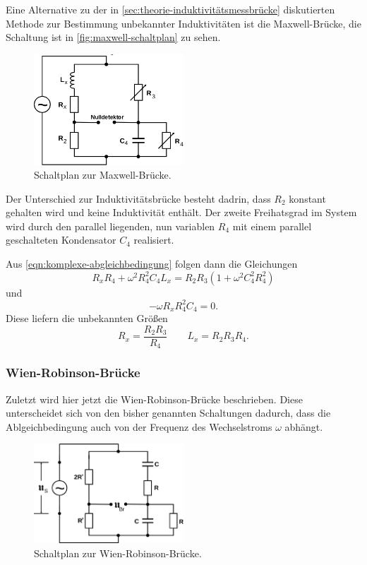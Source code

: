 Eine Alternative zu der in \autoref{sec:theorie-induktivitätsmessbrücke} diskutierten Methode zur
Bestimmung unbekannter Induktivitäten ist die Maxwell-Brücke, die Schaltung ist in 
\autoref{fig:maxwell-schaltplan} zu sehen.
\begin{figure}[H]
	\centering
	\includegraphics[width=0.5\textwidth]{bilder/maxwellbruecke.png}
	\caption{Schaltplan zur Maxwell-Brücke.}
	\label{fig:maxwell-schaltplan}
\end{figure}

Der Unterschied zur Induktivitätsbrücke besteht dadrin, dass $R_2$ konstant gehalten wird und keine 
Induktivität enthält. Der zweite Freihatsgrad im System wird durch den parallel liegenden, nun
variablen $R_4$ mit einem parallel geschalteten Kondensator $C_4$ realisiert.

Aus \autoref{eqn:komplexe-abgleichbedingung} folgen dann die Gleichungen
\begin{equation}
	R_x R_4 + \omega^2 R_4^2 C_4 L_x = R_2 R_3 \left(1 + \omega^2 C_4^2 R_4^2 \right)
	\label{eqn:maxwell-gleichung1}
\end{equation}
und
\begin{equation}
	-\omega R_x R_4^2 C_4 = 0.
	\label{eqn:maxwell-gleichung2}
\end{equation}
Diese liefern die unbekannten Größen
\begin{equation}
	R_x = \frac{R_2 R_3}{R_4}
	\qquad
	L_x = R_2 R_3 R_4.
	\label{eqn:kenngroessen-maxwell}
\end{equation}

\subsubsection{Wien-Robinson-Brücke}
\label{sec:theorie-wien-robinson-bruecke}
Zuletzt wird hier jetzt die Wien-Robinson-Brücke beschrieben. Diese unterscheidet sich von den 
bisher genannten Schaltungen dadurch, dass die Ablgeichbedingung auch von der Frequenz des Wechselstroms $\omega$
abhängt.
\begin{figure}[H]
	\centering
	\includegraphics[width=0.5\textwidth]{bilder/wien-robinson.png}
	\caption{Schaltplan zur Wien-Robinson-Brücke.}
	\label{fig:wien-robinson-schaltplan}
\end{figure}

